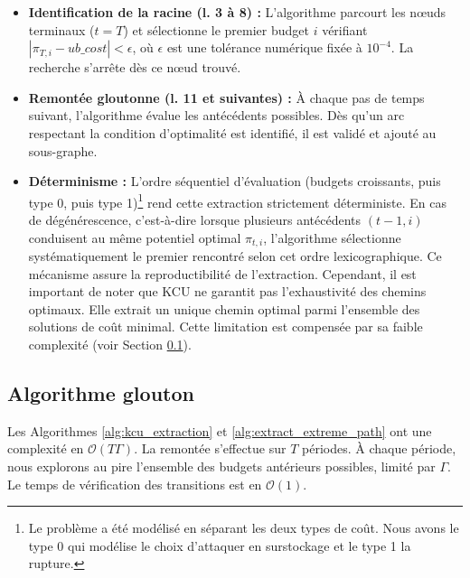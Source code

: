\documentclass[11pt,a4paper]{article}
\begin{document}
\begin{itemize}
    \item \textbf{Identification de la racine (l. 3 à 8) :} L'algorithme parcourt les nœuds terminaux ($t=T$) et sélectionne le premier budget $i$ vérifiant $|\pi_{T,i} - ub\_cost| < \epsilon$, où $\epsilon$ est une tolérance numérique fixée à $10^{-4}$. La recherche s'arrête dès ce nœud trouvé.
    \item \textbf{Remontée gloutonne (l. 11 et suivantes) :} À chaque pas de temps suivant, l'algorithme évalue les antécédents possibles. Dès qu'un arc respectant la condition d'optimalité est identifié, il est validé et ajouté au sous-graphe.
    \item \textbf{Déterminisme :} L'ordre séquentiel d'évaluation (budgets croissants, puis type 0, puis type 1)\footnote{Le problème a été modélisé en séparant les deux types de coût. Nous avons le type 0 qui modélise le choix d'attaquer en surstockage et le type 1 la rupture.} rend cette extraction strictement déterministe. En cas de dégénérescence, c'est-à-dire lorsque plusieurs antécédents $(t-1, i)$ conduisent au même potentiel optimal $\pi_{t,i}$, l'algorithme sélectionne systématiquement le premier rencontré selon cet ordre lexicographique. Ce mécanisme assure la reproductibilité de l'extraction. Cependant, il est important de noter que KCU ne garantit pas l'exhaustivité des chemins optimaux. Elle extrait un unique chemin optimal parmi l'ensemble des solutions de coût minimal. Cette limitation est compensée par sa faible complexité (voir Section \ref{subsec:algo_kcu}).
\end{itemize}

\subsection{Algorithme glouton}
\label{subsec:algo_kcu}

Les Algorithmes \ref{alg:kcu_extraction} et \ref{alg:extract_extreme_path} ont une complexité en $\mathcal{O}(T\Gamma)$. La remontée s'effectue sur $T$ périodes. À chaque période, nous explorons au pire l'ensemble des budgets antérieurs possibles, limité par $\Gamma$. Le temps de vérification des transitions est en $\mathcal{O}(1)$.
\end{document}
